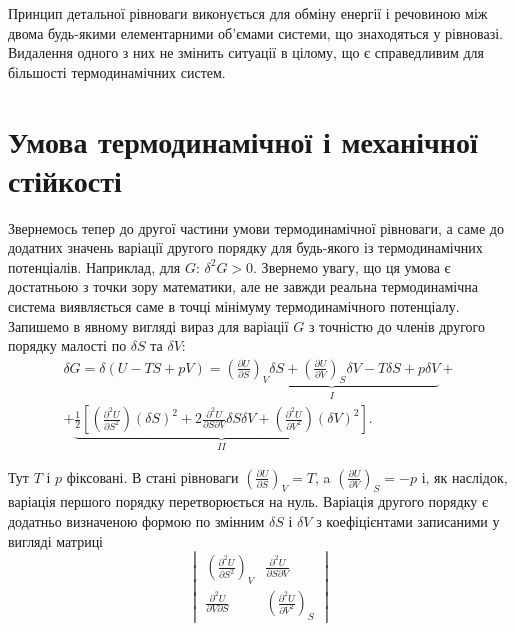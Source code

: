 Принцип детальної рівноваги виконується для обміну енергії і речовиною між двома будь-якими елементарними об'ємами системи, що знаходяться у рівновазі. Видалення одного з них не змінить ситуації в цілому, що є справедливим для більшості термодинамічних систем.

\section{Умова термодинамічної і механічної стійкості}

Звернемось тепер до другої частини умови термодинамічної рівноваги, а саме до додатних значень варіації другого порядку для будь-якого із термодинамічних потенціалів. Наприклад, для $G$: $\delta^2 G > 0$. Звернемо увагу, що ця умова є достатньою з точки зору математики, але не завжди реальна термодинамічна система виявляється саме в точці мінімуму термодинамічного потенціалу. Запишемо в явному вигляді вираз для варіації $G$ з точністю до членів другого порядку малості по $\delta S$ та $\delta V$:
\begin{multline}\label{83_1}
\delta G = \delta (U - T S + p V) = \underbrace{\left(\frac{\partial U}{\partial S}\right)_V \delta S + \left(\frac{\partial U}{\partial V}\right)_S \delta V - T \delta S + p \delta V}_{I} + \\
+ \underbrace{\frac{1}{2} \left[\left(\frac{\partial^2 U}{\partial S^2}\right) (\delta S)^2 + 2 \frac{\partial^2 U}{\partial S \partial V} \delta S \delta V + \left(\frac{\partial^2 U}{\partial V^2}\right) (\delta V)^2\right]}_{II} .
\end{multline}

Тут $T$ і $p$ фіксовані. В стані рівноваги $\left(\frac{\partial U}{\partial S}\right)_V = T$, a $\left(\frac{\partial U}{\partial V}\right)_S = -p$ і, як наслідок, варіація першого порядку перетворюється на нуль. Варіація другого порядку є додатньо визначеною формою по змінним $\delta S$ і $\delta V$ з коефіцієнтами записаними у вигляді матриці
\begin{equation}\label{83_2}
\begin{vmatrix}
\left(\frac{\partial^2 U}{\partial S^2}\right)_V & \frac{\partial^2 U}{\partial S \partial V} \\
\frac{\partial^2 U}{\partial V \partial S} & \left(\frac{\partial^2 U}{\partial V^2}\right)_S
\end{vmatrix}
\end{equation}

